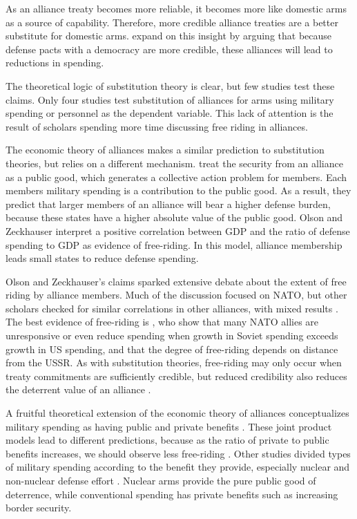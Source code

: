 \documentclass[12pt]{article}
\begin{document}
As an alliance treaty becomes more reliable, it becomes more like domestic arms as a source of capability. Therefore, more credible alliance treaties are a better substitute for domestic arms. \citet{DigiuseppePoast2016} expand on this insight by arguing that because defense pacts with a democracy are more credible, these alliances will lead to reductions in spending. 

The theoretical logic of substitution theory is clear, but few studies test these claims. Only four studies test substitution of alliances for arms using military spending or personnel as the dependent variable. This lack of attention is the result of scholars spending more time discussing free riding in alliances. 

The economic theory of alliances makes a similar prediction to substitution theories, but relies on a different mechanism. \citet{OlsonZeckhauser1966} treat the security from an alliance as a public good, which generates a collective action problem for members. Each members military spending is a contribution to the public good. As a result, they predict that larger members of an alliance will bear a higher defense burden, because these states have a higher absolute value of the public good. Olson and Zeckhauser interpret a positive correlation between GDP and the ratio of defense spending to GDP as evidence of free-riding. In this model, alliance membership leads small states to reduce defense spending. 

Olson and Zeckhauser's claims sparked extensive debate about the extent of free riding by alliance members. Much of the discussion focused on NATO, but other scholars checked for similar correlations in other alliances, with mixed results \citep{Reisinger1983, Thies1987, GatesTerasawa1992, OnealWhatley1996, Siroky2012}. The best evidence of free-riding is \citet{PluemperNeumayer2015}, who show that many NATO allies are unresponsive or even reduce spending when growth in Soviet spending exceeds growth in US spending, and that the degree of free-riding depends on distance from the USSR. As with substitution theories, free-riding may only occur when treaty commitments are sufficiently credible, but reduced credibility also reduces the deterrent value of an alliance \citep{GatesTerasawa1992}. 

A fruitful theoretical extension of the economic theory of alliances conceptualizes military spending as having public and private benefits \citep{ConybeareSandler1990}. These joint product models lead to different predictions, because as the ratio of private to public benefits increases, we should observe less free-riding \citep{Murdoch1995, SandlerHartley2001}. Other studies divided types of military spending according to the benefit they provide, especially nuclear and non-nuclear defense effort \citep{Hansenetal1990}. Nuclear arms provide the pure public good of deterrence, while conventional spending has private benefits such as increasing border security. 
\end{document}
